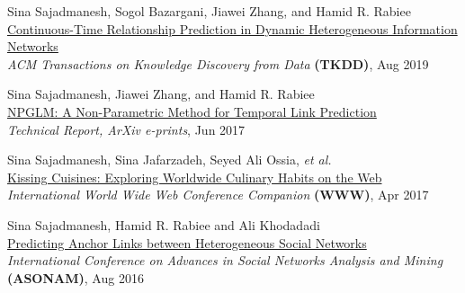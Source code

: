 \documentclass[11pt]{article}
\begin{document}
\begin{outerlist}
	\item {Sina Sajadmanesh}, Sogol Bazargani, Jiawei Zhang, and Hamid R. Rabiee\\
	\href{https://arxiv.org/abs/1710.00818}{{Continuous-Time Relationship Prediction in Dynamic Heterogeneous Information Networks}}\\
	\textit{ACM Transactions on Knowledge Discovery from Data} \textbf{(TKDD)}, Aug 2019

	\item {Sina Sajadmanesh}, Jiawei Zhang, and Hamid R. Rabiee\\
	\href{https://arxiv.org/abs/1706.06783}{{NPGLM: A Non-Parametric Method for Temporal Link Prediction}}\\
	\textit{Technical Report, ArXiv e-prints}, Jun 2017

	\item {Sina Sajadmanesh}, Sina Jafarzadeh, Seyed Ali Ossia, \textit{et al.}\\
	\href{https://arxiv.org/pdf/1610.08469}{{Kissing Cuisines: Exploring Worldwide Culinary Habits on the Web}}\\
	\textit{International World Wide Web Conference Companion} \textbf{(WWW)}, Apr 2017

	\item {Sina Sajadmanesh}, Hamid R. Rabiee and Ali Khodadadi\\
	\href{https://arxiv.org/pdf/1607.08821}{{Predicting Anchor Links between Heterogeneous Social Networks}}\\
	\textit{International Conference on Advances in Social Networks Analysis and Mining} \textbf{(ASONAM)},  Aug 2016

\end{outerlist}
\end{document}
